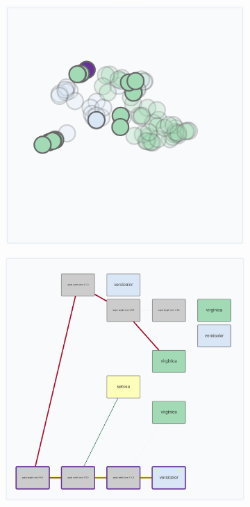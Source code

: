 \begin{figure}[htbp]
    \centering

    \begin{subfigure}[c]{0.325\textwidth}
        \includegraphics[width=\linewidth]{images/teacherVariousInteractionsBlocksScatter.png}
    \end{subfigure}
    \begin{subfigure}[c]{0.325\textwidth}
        \includegraphics[width=\linewidth]{images/teacherVariousInteractionsBlocks.png}
    \end{subfigure}


\end{figure}
